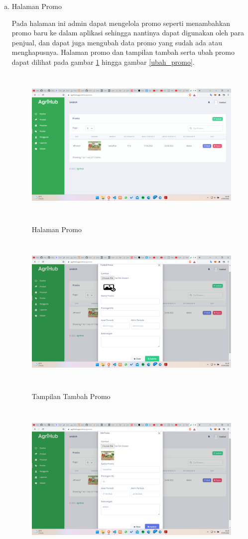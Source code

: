\begin{enumerate}
\begin{enumerate}[a.]
		\item Halaman Promo
		\par Pada halaman ini admin dapat mengelola promo seperti menambahkan promo baru ke dalam aplikasi sehingga nantinya dapat digunakan oleh para penjual, dan dapat juga mengubah data promo yang sudah ada atau menghapusnya. Halaman promo dan tampilan tambah serta ubah promo dapat dilihat pada gambar \ref*{promo} hingga gambar \ref*{ubah_promo}.
		\begin{figure}[H]
			\centering
			{\includegraphics [width = 13cm, height= 7.5cm]{gambar/admin/promo}}
			\caption{Halaman Promo}
			\label{promo}
		\end{figure}
		\begin{figure}[H]
			\centering
			{\includegraphics [width = 13cm, height= 7.5cm]{gambar/admin/tambah_promo}}
			\caption{Tampilan Tambah Promo}
			\label{tambah_promo}
		\end{figure}
		\begin{figure}[H]
			\centering
			{\includegraphics [width = 13cm, height= 7.5cm]{gambar/admin/ubah_promo}}

\end{figure}
\end{enumerate}
\end{enumerate}

